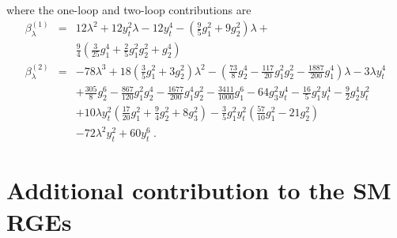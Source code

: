 \documentclass[aps,prd,preprint,superscriptaddress,showpacs,ctexart]{revtex4-1}
\begin{document}
where the one-loop and two-loop contributions are
\begin{eqnarray}
\beta_{\lambda}^{(1)} & = & 12\lambda^{2}+12y_{t}^{2}\lambda-12y_{t}^{4}-\left(\frac{9}{5}g_{1}^{2}+9g_{2}^{2}\right)\lambda+\nonumber \\
 &  & \frac{9}{4}\left(\frac{3}{25}g_{1}^{4}+\frac{2}{5}g_{1}^{2}g_{2}^{2}+g_{2}^{4}\right)\label{A7}\\
\beta_{\lambda}^{(2)} & = & -78\lambda^{3}+18\left(\frac{3}{5}g_{1}^{2}+3g_{2}^{2}\right)\lambda^{2}-\left(\frac{73}{8}g_{2}^{4}-\frac{117}{20}g_{1}^{2}g_{2}^{2}-\frac{1887}{200}g_{1}^{4}\right)\lambda-3\lambda y_{t}^{4}\nonumber \\
 &  & +\frac{305}{8}g_{2}^{6}-\frac{867}{120}g_{1}^{2}g_{2}^{4}-\frac{1677}{200}g_{1}^{4}g_{2}^{2}-\frac{3411}{1000}g_{1}^{6}-64g_{3}^{2}y_{t}^{4}-\frac{16}{5}g_{1}^{2}y_{t}^{4}-\frac{9}{2}g_{2}^{4}y_{t}^{2}\nonumber \\
 &  & +10\lambda y_{t}^{2}\left(\frac{17}{20}g_{1}^{2}+\frac{9}{4}g_{2}^{2}+8g_{3}^{2}\right)-\frac{3}{5}g_{1}^{2}y_{t}^{2}\left(\frac{57}{10}g_{1}^{2}-21g_{2}^{2}\right)\nonumber \\
 &  & -72\lambda^{2}y_{t}^{2}+60y_{t}^{6}~.~\,
\end{eqnarray}

\section{Additional contribution to the SM RGEs}
\end{document}
